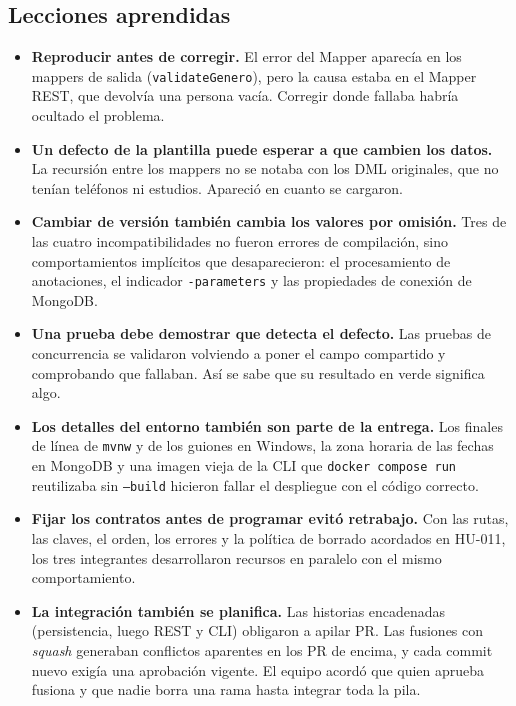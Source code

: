 \documentclass[11pt,a4paper]{article}
\begin{document}
\subsection{Lecciones aprendidas}
\begin{itemize}
\item \textbf{Reproducir antes de corregir.} El error del Mapper aparecía en los
mappers de salida (\texttt{validateGenero}), pero la causa estaba en el Mapper
REST, que devolvía una persona vacía. Corregir donde fallaba habría ocultado el
problema.
\item \textbf{Un defecto de la plantilla puede esperar a que cambien los datos.}
La recursión entre los mappers no se notaba con los DML originales, que no tenían
teléfonos ni estudios. Apareció en cuanto se cargaron.
\item \textbf{Cambiar de versión también cambia los valores por omisión.} Tres de
las cuatro incompatibilidades no fueron errores de compilación, sino
comportamientos implícitos que desaparecieron: el procesamiento de anotaciones,
el indicador \texttt{-parameters} y las propiedades de conexión de MongoDB.
\item \textbf{Una prueba debe demostrar que detecta el defecto.} Las pruebas de
concurrencia se validaron volviendo a poner el campo compartido y comprobando que
fallaban. Así se sabe que su resultado en verde significa algo.
\item \textbf{Los detalles del entorno también son parte de la entrega.} Los
finales de línea de \texttt{mvnw} y de los guiones en Windows, la zona horaria
de las fechas en MongoDB y una imagen vieja de la CLI que \texttt{docker compose
run} reutilizaba sin \texttt{--build} hicieron fallar el despliegue con el código
correcto.
\item \textbf{Fijar los contratos antes de programar evitó retrabajo.} Con las
rutas, las claves, el orden, los errores y la política de borrado acordados en
HU-011, los tres integrantes desarrollaron recursos en paralelo con el mismo
comportamiento.
\item \textbf{La integración también se planifica.} Las historias encadenadas
(persistencia, luego REST y CLI) obligaron a apilar PR. Las fusiones con
\emph{squash} generaban conflictos aparentes en los PR de encima, y cada commit
nuevo exigía una aprobación vigente. El equipo acordó que quien aprueba fusiona y
que nadie borra una rama hasta integrar toda la pila.
\end{itemize}
\end{document}
